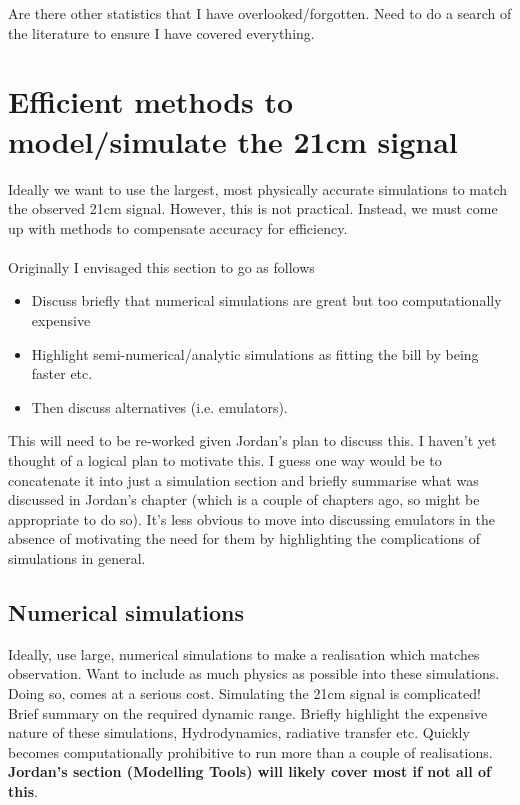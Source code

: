 Are there other statistics that I have overlooked/forgotten. Need to do a search of the literature to ensure I have covered everything.

\section{Efficient methods to model/simulate the 21cm signal}

Ideally we want to use the largest, most physically accurate simulations to match the observed 21cm signal. However, this is not practical. Instead, we must come up with methods to compensate accuracy for efficiency.\\
\\
Originally I envisaged this section to go as follows
\begin{itemize}
\item Discuss briefly that numerical simulations are great but too computationally expensive
\item Highlight semi-numerical/analytic simulations as fitting the bill by being faster etc.
\item Then discuss alternatives (i.e. emulators).
\end{itemize}
This will need to be re-worked given Jordan's plan to discuss this. I haven't yet thought of a logical plan to motivate this. I guess one way would be to concatenate it into just a simulation section and briefly summarise what was discussed in Jordan's chapter (which is a couple of chapters ago, so might be appropriate to do so). It's less obvious to move into discussing emulators in the absence of motivating the need for them by highlighting the complications of simulations in general.

\subsection{Numerical simulations}

Ideally, use large, numerical simulations to make a realisation which matches observation. Want to include as much physics as possible into these simulations. Doing so, comes at a serious cost. Simulating the 21cm signal is complicated! Brief summary on the required dynamic range. Briefly highlight the expensive nature of these simulations, Hydrodynamics, radiative transfer etc. Quickly becomes computationally prohibitive to run more than a couple of realisations. \textbf{Jordan's section (Modelling Tools) will likely cover most if not all of this}.

